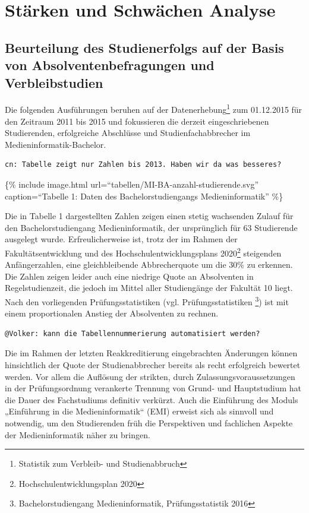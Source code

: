 \section{Stärken und Schwächen
Analyse}\label{stuxe4rken-und-schwuxe4chen-analyse}

\subsection{Beurteilung des Studienerfolgs auf der Basis von
Absolventenbefragungen und
Verbleibstudien}\label{beurteilung-des-studienerfolgs-auf-der-basis-von-absolventenbefragungen-und-verbleibstudien}

Die folgenden Ausführungen beruhen auf der Datenerhebung\footnote{Statistik
  zum Verbleib- und Studienabbruch} zum 01.12.2015 für den Zeitraum 2011
bis 2015 und fokussieren die derzeit eingeschriebenen Studierenden,
erfolgreiche Abschlüsse und Studienfachabbrecher im
Medieninformatik-Bachelor.

\begin{verbatim}
cn: Tabelle zeigt nur Zahlen bis 2013. Haben wir da was besseres?
\end{verbatim}

\{\% include image.html url=``tabellen/MI-BA-anzahl-studierende.svg''
caption=``Tabelle 1: Daten des Bachelorstudiengangs Medieninformatik''
\%\}

Die in Tabelle 1 dargestellten Zahlen zeigen einen stetig wachsenden
Zulauf für den Bachelorstudiengang Medieninformatik, der ursprünglich
für 63 Studierende ausgelegt wurde. Erfreulicherweise ist, trotz der im
Rahmen der Fakultätsentwicklung und des Hochschulentwicklungsplans
2020\footnote{Hochschulentwicklungsplan 2020} steigenden Anfängerzahlen,
eine gleichbleibende Abbrecherquote um die 30\% zu erkennen. Die Zahlen
zeigen leider auch eine niedrige Quote an Absolventen in
Regelstudienzeit, die jedoch im Mittel aller Studiengänge der Fakultät
10 liegt. Nach den vorliegenden Prüfungsstatistiken (vgl.
Prüfungsstatistiken \footnote{Bachelorstudiengang Medieninformatik,
  Prüfungsstatistik 2016}) ist mit einem proportionalen Anstieg der
Absolventen zu rechnen.

\begin{verbatim}
@Volker: kann die Tabellennummerierung automatisiert werden?
\end{verbatim}

Die im Rahmen der letzten Reakkreditierung eingebrachten Änderungen
können hinsichtlich der Quote der Studienabbrecher bereits als recht
erfolgreich bewertet werden. Vor allem die Auflösung der strikten, durch
Zulassungsvoraussetzungen in der Prüfungsordnung verankerte Trennung von
Grund- und Hauptstudium hat die Dauer des Fachstudiums definitiv
verkürzt. Auch die Einführung des Moduls „Einführung in die
Medieninformatik`` (EMI) erweist sich als sinnvoll und notwendig, um den
Studierenden früh die Perspektiven und fachlichen Aspekte der
Medieninformatik näher zu bringen.

